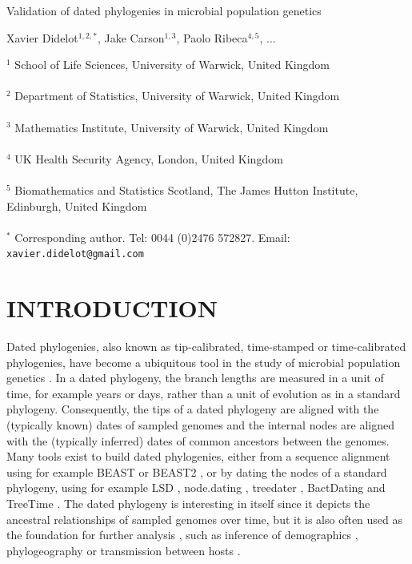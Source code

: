\documentclass{article}
\begin{document}
{\Large Validation of dated phylogenies in microbial population genetics}


\vspace*{2cm}
Xavier Didelot$^{1,2,*}$, Jake Carson$^{1,3}$, Paolo Ribeca$^{4,5}$, ...

\vspace*{2cm}
$^1$ School of Life Sciences, University of Warwick, United Kingdom\\\\
$^2$ Department of Statistics, University of Warwick, United Kingdom\\\\
$^3$ Mathematics Institute, University of Warwick, United Kingdom\\\\
$^4$ UK Health Security Agency, London, United Kingdom\\\\
$^5$ Biomathematics and Statistics Scotland, The James Hutton Institute, Edinburgh, United Kingdom\\\\
$^*$ Corresponding author. Tel: 0044 (0)2476 572827. Email: \verb+xavier.didelot@gmail.com+



\newpage
\section*{INTRODUCTION}

Dated phylogenies, also known as tip-calibrated, time-stamped or time-calibrated phylogenies, have become a ubiquitous tool in the study of microbial population genetics 
\citep{Drummond2003,Biek2015,rieuxInferencesTipcalibratedPhylogenies2016}. In a dated phylogeny, the branch lengths are measured in a unit of time, for example years or days,
rather than a unit of evolution as in a standard phylogeny. Consequently, the tips of a dated phylogeny are aligned with the (typically known) dates of sampled genomes and
the internal nodes are aligned with the (typically inferred) dates of common ancestors between the genomes.
Many tools exist to build dated phylogenies, either from a sequence alignment using for example BEAST \citep{Suchard2018} or BEAST2 \citep{Bouckaert2019}, or by
dating the nodes of a standard phylogeny, using for example 
LSD \citep{To2016}, node.dating \citep{Jones2017}, treedater \citep{Volz2017}, BactDating \citep{Didelot2018} and TreeTime \citep{Sagulenko2018}.
The dated phylogeny is interesting in itself since it depicts the ancestral relationships of sampled genomes
over time, but it is also often used as the foundation for further analysis \citep{Didelot2022}, such as inference
of demographics \citep{Baele2016}, phylogeography \citep{Lemey2009} 
or transmission between hosts \citep{Didelot2017}.
\end{document}
